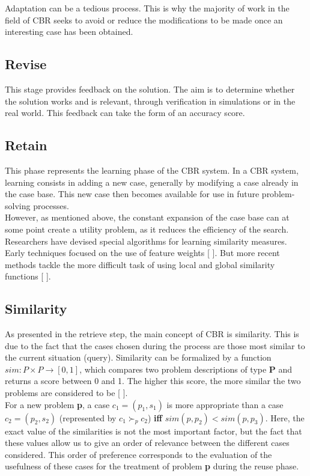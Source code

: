     Adaptation can be a tedious process. This is why the majority of work in the field of CBR seeks to avoid or reduce the modifications to be made once an interesting case has been obtained.


    \subsection{Revise}
    This stage provides feedback on the solution. The aim is to determine whether the solution works and is relevant, through verification in simulations or in the real world. This feedback can take the form of an accuracy score.
    
    
    \subsection{Retain}
    This phase represents the learning phase of the CBR system. In a CBR system, learning consists in adding a new case, generally by modifying a case already in the case base. This new case then becomes available for use in future problem-solving processes.\\
    However, as mentioned above, the constant expansion of the case base can at some point create a utility problem, as it reduces the efficiency of the search. Researchers have devised special algorithms for learning similarity measures. Early techniques focused on the use of feature weights [ ]. But more recent methods tackle the more difficult task of using local and global similarity functions [ ]. 

    
    
    \subsection{Similarity\label{subsec:similarity}}
    As presented in the retrieve step, the main concept of CBR is similarity. This is due to the fact that the cases chosen during the process are those most similar to the current situation (query). Similarity can be formalized by a function $sim: P \times P \rightarrow [0, 1]$, which compares two problem descriptions of type \textbf{P} and returns a score between 0 and 1. The higher this score, the more similar the two problems are considered to be [ ].\\
    For a new problem \textbf{p}, a case $c_1 = (p_1, s_1)$ is more appropriate than a case $c_2 = (p_2, s_2)$ (represented by $c_1 \succ_p c_2$) \textbf{iff} $sim(p, p_2) < sim(p, p_3)$. Here, the exact value of the similarities is not the most important factor, but the fact that these values allow us to give an order of relevance between the different cases considered. This order of preference corresponds to the evaluation of the usefulness of these cases for the treatment of problem \textbf{p} during the reuse phase.\\
    
